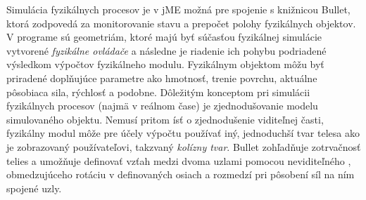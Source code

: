 Simulácia fyzikálnych procesov je v jME možná pre spojenie s knižnicou Bullet, ktorá zodpovedá za monitorovanie stavu a prepočet polohy fyzikálnych objektov. V programe sú geometriám, ktoré majú byť súčasťou fyzikálnej simulácie vytvorené \textit{fyzikálne ovládače} a následne je riadenie ich pohybu podriadené výsledkom výpočtov fyzikálneho modulu. Fyzikálnym objektom môžu byť priradené doplňujúce parametre ako hmotnosť, trenie povrchu, aktuálne pôsobiaca sila, rýchlosť a podobne. Dôležitým konceptom pri simulácii fyzikálnych procesov (najmä v reálnom čase) je zjednodušovanie modelu simulovaného objektu. Nemusí pritom ísť o zjednodušenie viditeľnej časti, fyzikálny modul môže pre účely výpočtu používať iný, jednoduchší tvar telesa ako je zobrazovaný používateľovi, takzvaný \textit{kolízny tvar}. Bullet zohľadňuje zotrvačnosť telies a umožňuje definovať vzťah medzi dvoma uzlami pomocou neviditeľného , obmedzujúceho rotáciu v definovaných osiach a rozmedzí pri pôsobení síl na ním spojené uzly.

